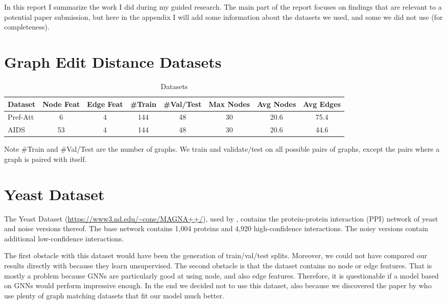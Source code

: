 \appendix
\appendixpage

In this report I summarize the work I did during my guided research. The main part of the report focuses on findings that are relevant to a potential paper submission, but here in the appendix I will add some information about the datasets we used, and some we did not use (for completeness).


\section{Graph Edit Distance Datasets}
\begin{table}[htbp]
    \addtolength{\tabcolsep}{-1pt}
    \fontsize{9pt}{10.25pt}\selectfont
    \centering
    \renewcommand{\arraystretch}{1.2}
    \begin{tabular}{|l|c|c|c|c|c|c|c|}
        \hline
        Dataset & Node Feat & Edge Feat & \#Train & \#Val/Test & Max Nodes & Avg Nodes & Avg Edges \\
        \hline
        Pref-Att & 6 & 4 & 144 & 48 & 30 & 20.6 & 75.4 \\ %
        \hline
        AIDS & 53 & 4 & 144 & 48 & 30 & 20.6 & 44.6 \\ %
        \hline
    \end{tabular}
    \caption{Datasets}
    \label{tab:ex1-data}
\end{table}

Note \#Train and \#Val/Test are the number of graphs. We train and validate/test on all possible pairs of graphs, except the pairs where a graph is paired with itself.

\section{Yeast Dataset}

The Yeast Dataset (\url{https://www3.nd.edu/~cone/MAGNA++/}), used by \cite{yeast2019}, contains the protein-protein interaction (PPI) network of yeast and noise versions thereof. The base network contains 1,004 proteins and 4,920 high-confidence interactions. The noisy versions contain additional low-confidence interactions.

The first obstacle with this dataset would have been the generation of train/val/test splits.  Moreover, we could not have compared our results directly with \cite{yeast2019} because they learn unsupervised. The second obstacle is that the dataset contains no node or edge features. That is mostly a problem because GNNs are particularly good at using node, and also edge features. Therefore, it is questionable if a  model based on GNNs would perform impressive enough. In the end we decided not to use this dataset, also because we discovered the paper by \cite{fey2020_update} who use plenty of graph matching datasets that fit our model much better.

